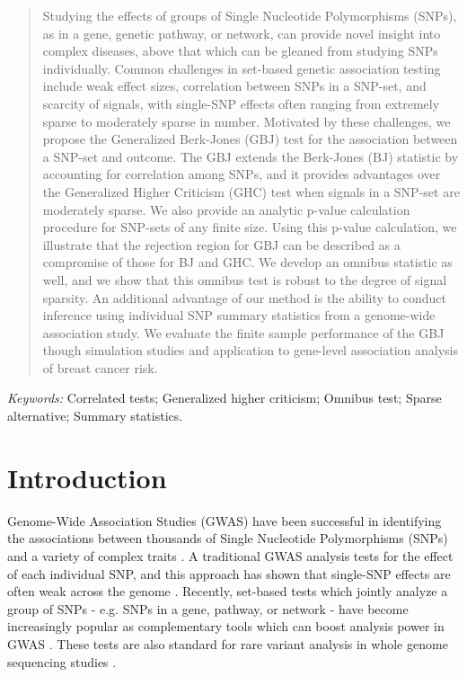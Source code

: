 \documentclass[12pt]{article}
\begin{document}
\bigskip
\begin{abstract}
Studying the effects of groups of Single Nucleotide Polymorphisms (SNPs), as in a gene, 
genetic pathway, or network, can provide novel insight into complex diseases, above that 
which can be gleaned from studying SNPs individually. 
Common challenges in set-based genetic association testing include weak effect sizes,
correlation between SNPs in a SNP-set, and scarcity of signals, with single-SNP effects
often ranging from extremely sparse to moderately sparse in number.
Motivated by these challenges, we propose the Generalized Berk-Jones (GBJ) test for 
the association between a SNP-set and outcome. 
The GBJ extends the Berk-Jones (BJ) statistic by accounting for correlation among 
SNPs, and it provides advantages over the Generalized Higher Criticism (GHC) test 
when signals in a SNP-set are moderately sparse.  
We also provide an analytic p-value calculation procedure for SNP-sets of any finite size.
Using this p-value calculation, we illustrate that the rejection region for GBJ can be described
as a compromise of those for BJ and GHC.
We develop an omnibus statistic as well, and we show that this omnibus test is robust to 
the degree of signal sparsity.
An additional advantage of our method is the ability to conduct inference using individual 
SNP summary statistics from a genome-wide association study.
We evaluate the finite sample performance of the GBJ though simulation studies and 
application to gene-level association analysis of breast cancer risk.
\end{abstract}

\noindent%
{\it Keywords:}  Correlated tests; Generalized higher criticism; Omnibus test; Sparse alternative; Summary statistics.
\vfill

\newpage
{} %

\baselineskip=12pt

\section{Introduction}
\label{p2_sec:intro}

Genome-Wide Association Studies (GWAS) have been successful in identifying the 
associations between thousands of Single Nucleotide Polymorphisms (SNPs) and 
a variety of complex traits \citep{Manolio_missing_herit}.  
A traditional GWAS analysis tests for the effect of each individual SNP, and this 
approach has shown that single-SNP effects are often weak across the genome 
\citep{Visscher_five}.  
Recently, set-based tests which jointly analyze a group of SNPs - e.g. SNPs in a 
gene, pathway, or network - have become increasingly popular as complementary 
tools which can boost analysis power in GWAS \citep{snp_set}.
These tests are also standard for rare variant analysis in whole genome sequencing 
studies \citep{rare_variant_review}.  
\end{document}
